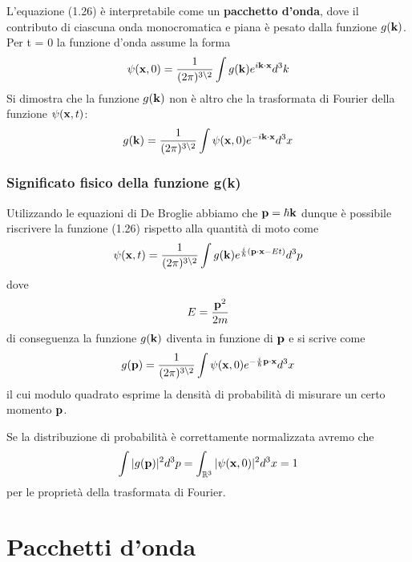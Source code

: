 \noindent L'equazione (1.26) \`e interpretabile come un \textbf{pacchetto d'onda}, dove il contributo di ciascuna onda monocromatica e piana \`e pesato dalla funzione $g(\bold{k})$. Per t = 0 la funzione d'onda assume la forma 
\begin{equation}
	\psi(\bold{x},0) = \frac{1}{(2\pi)^{3 \backslash 2}} \int g(\bold{k})e^{i\bold{k} \cdot \bold{x}}d^3k
\end{equation}
Si dimostra che la funzione $g(\bold{k})$ non \`e altro che la trasformata di Fourier della funzione $\psi(\bold{x},t)$:
\begin{equation}
	g(\bold{k}) = \frac{1}{(2\pi)^{3 \backslash 2}} \int \psi(\bold{x},0)e^{-i \bold{k} \cdot \bold{x}}d^3x 
\end{equation}

\subsubsection{Significato fisico della funzione g(k)}

Utilizzando le equazioni di De Broglie abbiamo che $\bold{p} = \hbar \bold{k} $ dunque \`e possibile riscrivere la funzione (1.26) rispetto alla quantit\`a di moto come 
\begin{equation*}
	\psi(\bold{x},t) = \frac{1}{(2\pi)^{3 \backslash 2}} \int g(\bold{k})e^{\frac{i}{\hbar}(\bold{p} \cdot \bold{x} - Et)}d^3p
\end{equation*}
dove 
\begin{equation*}
	E = \frac{\bold{p}^2}{2m}
\end{equation*}
di conseguenza la funzione $g(\bold{k})$ diventa in funzione di $\bold{p}$ e si scrive come 
\begin{equation*}
	g(\bold{p}) = \frac{1}{(2\pi)^{3 \backslash 2}} \int \psi(\bold{x},0)e^{-\frac{i}{\hbar}\bold{p} \cdot \bold{x}}d^3x
\end{equation*}
il cui modulo quadrato  esprime la densit\`a di probabilit\`a di misurare un certo momento $\bold{p}$. 
\newline

\noindent Se la distribuzione di probabilit\`a \`e correttamente normalizzata avremo che 
\begin{equation*}
	\int |g(\bold{p})|^2d^3p = \int_{\mathbb{R}^3} | \psi(\bold{x},0)|^2d^3x = 1
\end{equation*}
per le propriet\`a della trasformata di Fourier.
\newpage 

\section{Pacchetti d'onda}
